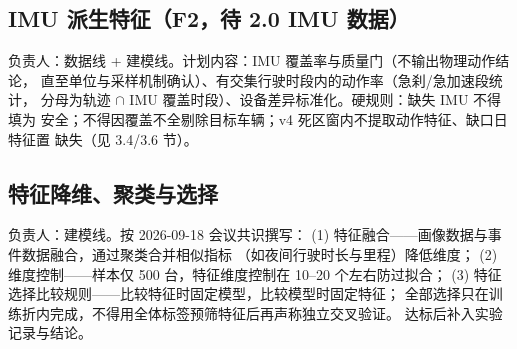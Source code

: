\subsection{IMU 派生特征（F2，待 2.0 IMU 数据）}

\begin{TODO}
负责人：数据线 + 建模线。计划内容：IMU 覆盖率与质量门（不输出物理动作结论，
直至单位与采样机制确认）、有交集行驶时段内的动作率（急刹/急加速段统计，
分母为轨迹 $\cap$ IMU 覆盖时段）、设备差异标准化。硬规则：缺失 IMU 不得填为
安全；不得因覆盖不全剔除目标车辆；v4 死区窗内不提取动作特征、缺口日特征置
缺失（见 3.4/3.6 节）。
\end{TODO}

\subsection{特征降维、聚类与选择}

\begin{TODO}
负责人：建模线。按 2026-09-18 会议共识撰写：
(1) 特征融合——画像数据与事件数据融合，通过聚类合并相似指标
（如夜间行驶时长与里程）降低维度；
(2) 维度控制——样本仅 500 台，特征维度控制在 10--20 个左右防过拟合；
(3) 特征选择比较规则——比较特征时固定模型，比较模型时固定特征；
全部选择只在训练折内完成，不得用全体标签预筛特征后再声称独立交叉验证。
达标后补入实验记录与结论。
\end{TODO}
